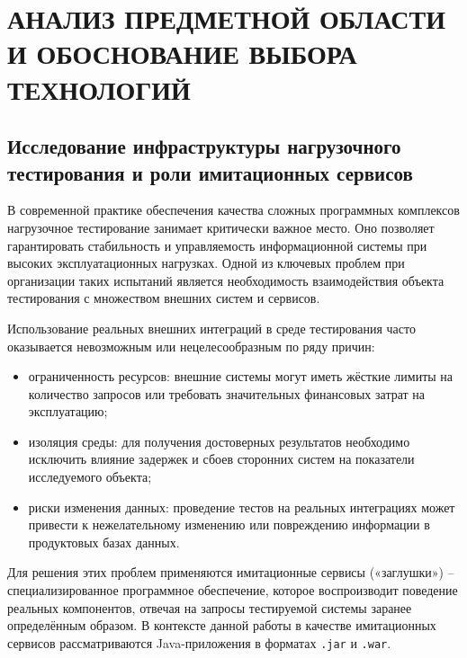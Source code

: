 \chapter{{\fontsize{14pt}{21pt}\selectfont\MakeUppercase{АНАЛИЗ ПРЕДМЕТНОЙ ОБЛАСТИ И ОБОСНОВАНИЕ ВЫБОРА ТЕХНОЛОГИЙ}}}
\label{cha:analysis}


\section{Исследование инфраструктуры нагрузочного тестирования и роли имитационных сервисов}

В современной практике обеспечения качества сложных программных комплексов нагрузочное тестирование занимает критически важное место. Оно позволяет гарантировать стабильность и управляемость информационной системы при высоких эксплуатационных нагрузках. Одной из ключевых проблем при организации таких испытаний является необходимость взаимодействия объекта тестирования с множеством внешних систем и сервисов.

Использование реальных внешних интеграций в среде тестирования часто оказывается невозможным или нецелесообразным по ряду причин:

\begin{itemize}
\item ограниченность ресурсов: внешние системы могут иметь жёсткие лимиты на количество запросов или требовать значительных финансовых затрат на эксплуатацию;
\item изоляция среды: для получения достоверных результатов необходимо исключить влияние задержек и сбоев сторонних систем на показатели исследуемого объекта;
\item риски изменения данных: проведение тестов на реальных интеграциях может привести к нежелательному изменению или повреждению информации в продуктовых базах данных.
\end{itemize}

Для решения этих проблем применяются имитационные сервисы («заглушки») -- специализированное программное обеспечение, которое воспроизводит поведение реальных компонентов, отвечая на запросы тестируемой системы заранее определённым образом. В контексте данной работы в качестве имитационных сервисов рассматриваются Java-приложения в форматах \texttt{.jar} и \texttt{.war}.


